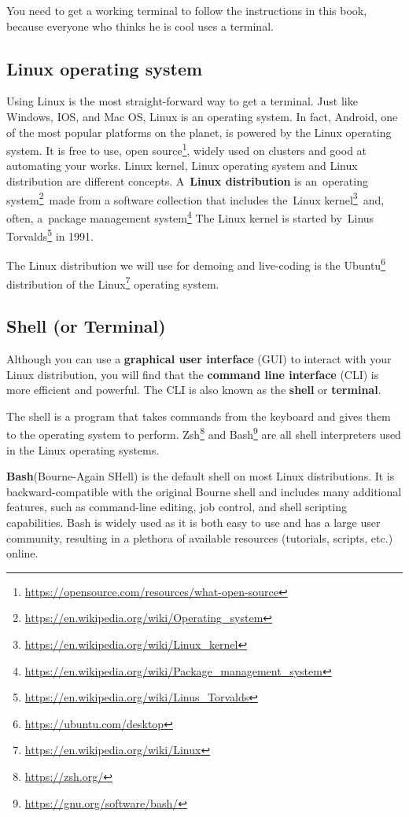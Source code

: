 \documentclass[
  notoc %
]{tufte-book}
\DeclareRobustCommand{\href}[2]{#2\footnote{\url{#1}}}
\begin{document}
You need to get a working terminal to follow the instructions in this
book, because everyone who thinks he is cool uses a terminal.

\hypertarget{sec:linux}{%
\subsection{Linux operating system}\label{sec:linux}}

Using Linux is the most straight-forward way to get a terminal. Just
like Windows, IOS, and Mac OS, Linux is an operating system. In fact,
Android, one of the most popular platforms on the planet, is powered by
the Linux operating system. It is free to use,
\href{https://opensource.com/resources/what-open-source}{open source},
widely used on clusters and good at automating your works. Linux kernel,
Linux operating system and Linux distribution are different concepts.
A~\textbf{Linux distribution} is
an~\href{https://en.wikipedia.org/wiki/Operating_system}{operating
system}~made from a software collection that includes
the~\href{https://en.wikipedia.org/wiki/Linux_kernel}{Linux kernel}~and,
often,
a~\href{https://en.wikipedia.org/wiki/Package_management_system}{package
management system} The Linux kernel is started
by~\href{https://en.wikipedia.org/wiki/Linus_Torvalds}{Linus Torvalds}
in 1991.

The Linux distribution we will use for demoing and live-coding is the
\href{https://ubuntu.com/desktop}{Ubuntu} distribution of the
\href{https://en.wikipedia.org/wiki/Linux}{Linux} operating system.

\hypertarget{sec:shell}{%
\subsection{Shell (or Terminal)}\label{sec:shell}}

Although you can use a \textbf{graphical user interface} (GUI) to
interact with your Linux distribution, you will find that the
\textbf{command line interface} (CLI) is more efficient and powerful.
The CLI is also known as the \textbf{shell} or \textbf{terminal}.

The shell is a program that takes commands from the keyboard and gives
them to the operating system to perform. \href{https://zsh.org/}{Zsh}
and \href{https://gnu.org/software/bash/}{Bash} are all shell
interpreters used in the Linux operating systems.

\textbf{Bash}(Bourne-Again SHell) is the default shell on most Linux
distributions. It is backward-compatible with the original Bourne shell
and includes many additional features, such as command-line editing, job
control, and shell scripting capabilities. Bash is widely used as it is
both easy to use and has a large user community, resulting in a plethora
of available resources (tutorials, scripts, etc.) online.
\end{document}
